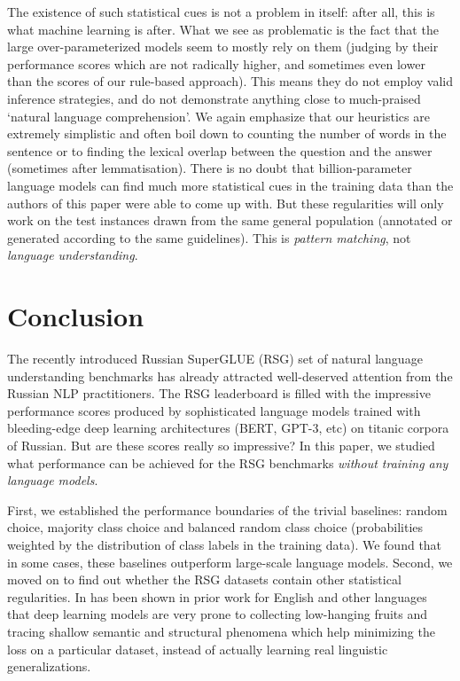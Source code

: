 \documentclass[11pt]{article}
\begin{document}
The existence of such statistical cues is not a problem in itself: after all, this is what machine learning is after. What we see as problematic is the fact that the large over-parameterized models seem to mostly rely on them (judging by their performance scores which are not radically higher, and sometimes even lower than the scores of our rule-based approach). This means they do not employ valid inference strategies, and do not demonstrate anything close to much-praised `natural language comprehension'. We again emphasize that our heuristics are extremely simplistic and often boil down to counting the number of words in the sentence or to finding the lexical overlap between the question and the answer (sometimes after lemmatisation). There is no doubt that billion-parameter language models can find much more statistical cues in the training data than the authors of this paper were able to come up with. But these regularities will only work on the test instances drawn from the same general population (annotated or generated according to the same guidelines). This is \textit{pattern matching}, not \textit{language understanding}.


\section{Conclusion}
\label{sec:conclusion}
The recently introduced Russian SuperGLUE (RSG) set of natural language understanding benchmarks \cite{shavrina-etal-2020-russiansuperglue} has already attracted well-deserved attention from the Russian NLP practitioners. The RSG leaderboard is filled with the impressive performance scores produced by sophisticated language models trained with bleeding-edge deep learning architectures (BERT, GPT-3, etc) on titanic corpora of Russian. But are these scores really so impressive? In this paper, we studied what performance can be achieved for the RSG benchmarks \textit{without training any language models}. 

First, we established the performance boundaries of the trivial baselines: random choice, majority class choice and balanced random class choice (probabilities weighted by the distribution of class labels in the training data). We found that in some cases, these baselines outperform large-scale language models. Second, we moved on to find out whether the RSG datasets contain other statistical regularities. In has been shown in prior work for English and other languages that deep learning models are very prone to collecting low-hanging fruits and tracing shallow semantic and structural phenomena which help minimizing the loss on a particular dataset, instead of actually learning real linguistic generalizations.
\end{document}
